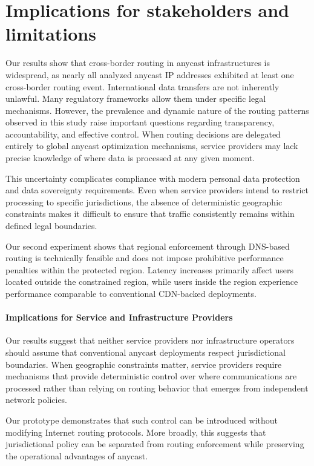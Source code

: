 \documentclass[acmsmall]{acmart}
\begin{document}
\section{Implications for stakeholders and limitations}
\label{sec:discussion}

Our results show that cross-border routing in anycast infrastructures is widespread, as nearly all analyzed anycast IP addresses exhibited at least one cross-border routing event. International data transfers are not inherently unlawful. Many regulatory frameworks allow them under specific legal mechanisms. However, the prevalence and dynamic nature of the routing patterns observed in this study raise important questions regarding transparency, accountability, and effective control. When routing decisions are delegated entirely to global anycast optimization mechanisms, service providers may lack precise knowledge of where data is processed at any given moment.

This uncertainty complicates compliance with modern personal data protection and data sovereignty requirements. Even when service providers intend to restrict processing to specific jurisdictions, the absence of deterministic geographic constraints makes it difficult to ensure that traffic consistently remains within defined legal boundaries.

Our second experiment shows that regional enforcement through DNS-based routing is technically feasible and does not impose prohibitive performance penalties within the protected region. Latency increases primarily affect users located outside the constrained region, while users inside the region experience performance comparable to conventional CDN-backed deployments.

\paragraph{Implications for Service and Infrastructure Providers}

Our results suggest that neither service providers nor infrastructure operators should assume that conventional anycast deployments respect jurisdictional boundaries. When geographic constraints matter, service providers require mechanisms that provide deterministic control over where communications are processed rather than relying on routing behavior that emerges from independent network policies.

Our prototype demonstrates that such control can be introduced without modifying Internet routing protocols. More broadly, this suggests that jurisdictional policy can be separated from routing enforcement while preserving the operational advantages of anycast.
\end{document}
